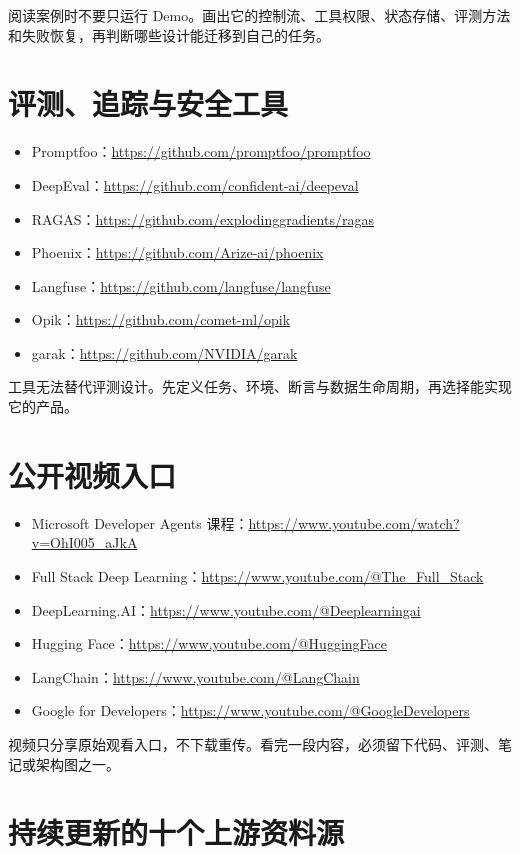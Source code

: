 阅读案例时不要只运行 Demo。画出它的控制流、工具权限、状态存储、评测方法和失败恢复，再判断哪些设计能迁移到自己的任务。

\section{评测、追踪与安全工具}

\begin{itemize}
  \item Promptfoo：\url{https://github.com/promptfoo/promptfoo}
  \item DeepEval：\url{https://github.com/confident-ai/deepeval}
  \item RAGAS：\url{https://github.com/explodinggradients/ragas}
  \item Phoenix：\url{https://github.com/Arize-ai/phoenix}
  \item Langfuse：\url{https://github.com/langfuse/langfuse}
  \item Opik：\url{https://github.com/comet-ml/opik}
  \item garak：\url{https://github.com/NVIDIA/garak}
\end{itemize}

工具无法替代评测设计。先定义任务、环境、断言与数据生命周期，再选择能实现它的产品。

\section{公开视频入口}

\begin{itemize}
  \item Microsoft Developer Agents 课程：\url{https://www.youtube.com/watch?v=OhI005_aJkA}
  \item Full Stack Deep Learning：\url{https://www.youtube.com/@The_Full_Stack}
  \item DeepLearning.AI：\url{https://www.youtube.com/@Deeplearningai}
  \item Hugging Face：\url{https://www.youtube.com/@HuggingFace}
  \item LangChain：\url{https://www.youtube.com/@LangChain}
  \item Google for Developers：\url{https://www.youtube.com/@GoogleDevelopers}
\end{itemize}

视频只分享原始观看入口，不下载重传。看完一段内容，必须留下代码、评测、笔记或架构图之一。

\section{持续更新的十个上游资料源}

